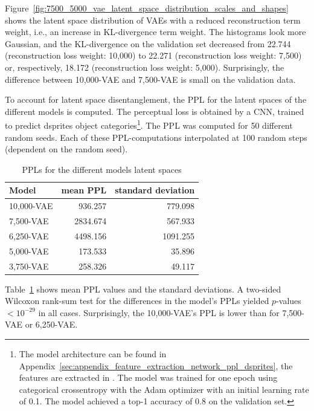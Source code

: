 Figure~\ref{fig:7500_5000_vae_latent_space_distribution_scales_and_shapes} shows the latent space distribution of \acp{VAE} with a reduced reconstruction term weight, i.e., an increase in \ac{KL-divergence} term weight.
The histograms look more Gaussian, and the \ac{KL-divergence} on the validation set decreased from 22.744 (reconstruction loss weight: 10,000) to 22.271 (reconstruction loss weight: 7,500) or, respectively, 18.172 (reconstruction loss weight: 5,000).
Surprisingly, the difference between 10,000-\ac{VAE} and 7,500-\ac{VAE} is small on the validation data.

To account for latent space disentanglement, the \ac{PPL} for the latent spaces of the different models is computed.
The perceptual loss is obtained by a \ac{CNN}, trained to predict dsprites object categories\footnote{The model architecture can be found in Appendix~\ref{sec:appendix_feature_extraction_network_ppl_dsprites}, the features are extracted in . The model was trained for one epoch using categorical crossentropy with the Adam optimizer with an initial learning rate of 0.1. The model achieved a top-1 accuracy of 0.8 on the validation set.}.
The \ac{PPL} was computed for 50 different random seeds.
Each of these \ac{PPL}-computations interpolated at 100 random steps (dependent on the random seed).

\begin{table}
    \centering
    \begin{tabular}{lrr}
        \toprule
        Model           & mean \ac{PPL} & standard deviation \\
        \midrule
        10,000-\ac{VAE} & 936.257       & 779.098            \\
        7,500-\ac{VAE}  & 2834.674      & 567.933            \\
        6,250-\ac{VAE}  & 4498.156      & 1091.255           \\
        5,000-\ac{VAE}  & 173.533       & 35.896             \\
        3,750-\ac{VAE}  & 258.326       & 49.117             \\
        \bottomrule
    \end{tabular}
    \caption{\acfp{PPL} for the different models latent spaces}
    \label{tab:ppl-dsprites}
\end{table}

Table~\ref{tab:ppl-dsprites} shows mean \ac{PPL} values and the standard deviations.
A two-sided Wilcoxon rank-sum test for the differences in the model's \acp{PPL} yielded $p$-values $< 10^{-29}$ in all cases.
Surprisingly, the 10,000-\ac{VAE}'s \ac{PPL} is lower than for 7,500-\ac{VAE} or 6,250-\ac{VAE}.

